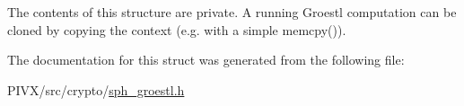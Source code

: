 The contents of this structure are private. A running Groestl computation can be cloned by copying the context (e.\+g. with a simple {\ttfamily memcpy()}). 

The documentation for this struct was generated from the following file\+:\begin{DoxyCompactItemize}
\item 
P\+I\+V\+X/src/crypto/\mbox{\hyperlink{sph__groestl_8h}{sph\+\_\+groestl.\+h}}\end{DoxyCompactItemize}
